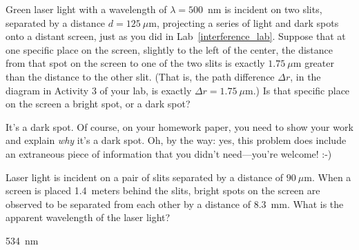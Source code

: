 \begin{Exercise}
Green laser light with a wavelength of $\lambda = 500$~nm is incident on two slits, separated by a distance $d=125~\mu$m, projecting a series of light and dark spots onto a distant screen, just as you did in Lab~\ref{interference_lab}.  Suppose that at one specific place on the screen, slightly to the left of the center, the distance from that spot on the screen to one of the two slits is exactly $1.75~\mu$m greater than the distance to the other slit.  (That is, the path difference $\Delta r$, in the diagram in Activity 3 of your lab, is exactly $\Delta r=1.75~\mu$m.)  Is that specific place on the screen a bright spot, or a dark spot?
\end{Exercise}
\begin{Answer}
It's a dark spot.  Of course, on your homework paper, you need to show your work and explain \textit{why} it's a dark spot.  Oh, by the way: yes, this problem does include an extraneous piece of information that you didn't need---you're welcome!  :-)
\end{Answer}


\begin{Exercise}
Laser light is incident on a pair of slits separated by a distance of $90~\mu$m.  When a screen is placed 1.4~meters behind the slits, bright spots on the screen are observed to be separated from each other by a distance of 8.3~mm.  What is the apparent wavelength of the laser light?
\end{Exercise}
\begin{Answer}
534~nm
\end{Answer}

